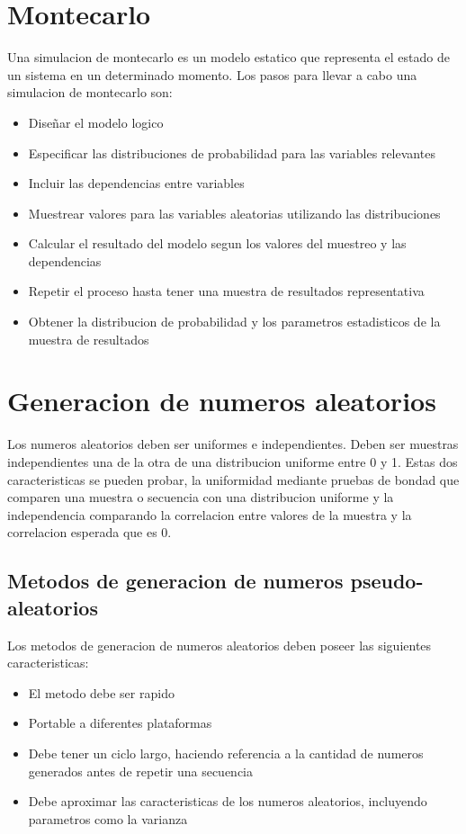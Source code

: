 \documentclass[a4paper]{article}
\begin{document}
\section*{Montecarlo}
Una simulacion de montecarlo es un modelo estatico que representa el estado de un sistema en un determinado momento.
Los pasos para llevar a cabo una simulacion de montecarlo son:
\begin{itemize}
    \item Diseñar el modelo logico
    \item Especificar las distribuciones de probabilidad para las variables relevantes
    \item Incluir las dependencias entre variables
    \item Muestrear valores para las variables aleatorias utilizando las distribuciones
    \item Calcular el resultado del modelo segun los valores del muestreo y las dependencias
    \item Repetir el proceso hasta tener una muestra de resultados representativa
    \item Obtener la distribucion de probabilidad y los parametros estadisticos de la muestra de resultados
\end{itemize}

\section{Generacion de numeros aleatorios} 
Los numeros aleatorios deben ser uniformes e independientes. Deben ser muestras independientes una
de la otra de una distribucion uniforme entre 0 y 1.
Estas dos caracteristicas se pueden probar, la uniformidad mediante pruebas de bondad que comparen una muestra o
secuencia con una distribucion uniforme y la independencia comparando la correlacion entre valores de la muestra y 
la correlacion esperada que es 0.

\subsection*{Metodos de generacion de numeros pseudo-aleatorios}
Los metodos de generacion de numeros aleatorios deben poseer las siguientes caracteristicas:
\begin{itemize}
    \item El metodo debe ser rapido
    \item Portable a diferentes plataformas
    \item Debe tener un ciclo largo, haciendo referencia a la cantidad de numeros generados antes de repetir una 
    secuencia
    \item Debe aproximar las caracteristicas de los numeros aleatorios, incluyendo parametros como la varianza
\end{itemize}
\end{document}
